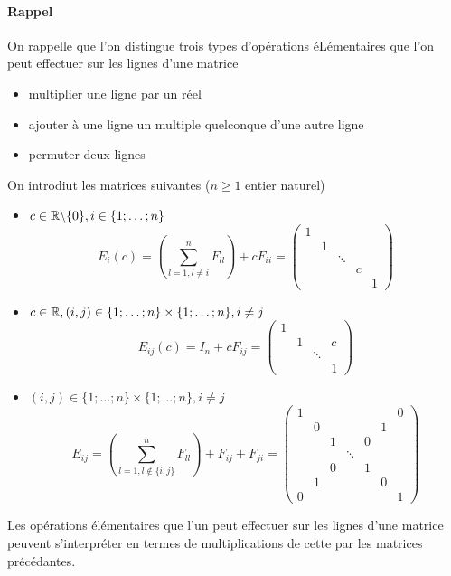 \paragraph{Rappel} On rappelle que l'on distingue trois types d'opérations éLémentaires que l'on peut effectuer sur les lignes d'une matrice
\begin{itemize}
  \item multiplier une ligne par un réel
  \item ajouter à une ligne un multiple quelconque d'une autre ligne
  \item permuter deux lignes
\end{itemize}
On introdiut les matrices suivantes ($n \geq 1$ entier naturel)
\begin{itemize}
  \item $c \in \mathbb{R} \backslash \{0 \}, i \in \{1; \ldots; n\}$
    $$E_i(c) = \left( \sum_{l=1, l\neq i}^n F_{ll} \right) +  c F_{ii} = 
      \begin{pmatrix}
        1 & & \\
        & 1 & \\
        & & \ddots & \\
        & & & c & \\
        & & & & 1
      \end{pmatrix}$$
      
  \item $c \in \mathbb{R}, (i, j) \in \{1;\ldots;n\}\times\{1;\ldots;n\}, i\neq j$
    $$E_{ij}(c) = I_n + c F_{ij} =
      \begin{pmatrix}
        1 & & & \\
        & 1 & & c \\
        & & \ddots & \\
        & & & 1
      \end{pmatrix}$$
      
  \item $(i, j) \in \{1; \ldots; n\}\times\{1;\ldots; n\}, i\neq j$
    $$E_{ij} = \left( \sum_{l=1, l \notin \{i; j\}}^n F_{ll} \right) + F_{ij} + F_{ji} = 
      \begin{pmatrix}
        1 & & & & & & 0 \\
        & 0 & & & & 1 & \\
        & & 1 & & 0 & & \\
        & & & \ddots & & & \\
        & & 0 & & 1 & & \\
        & 1 & & & & 0 & \\
        0 & & & & & & 1
      \end{pmatrix}$$
\end{itemize} 
Les opérations élémentaires que l'un peut effectuer sur les lignes d'une matrice peuvent s'interpréter en termes de multiplications de cette par les matrices précédantes.

